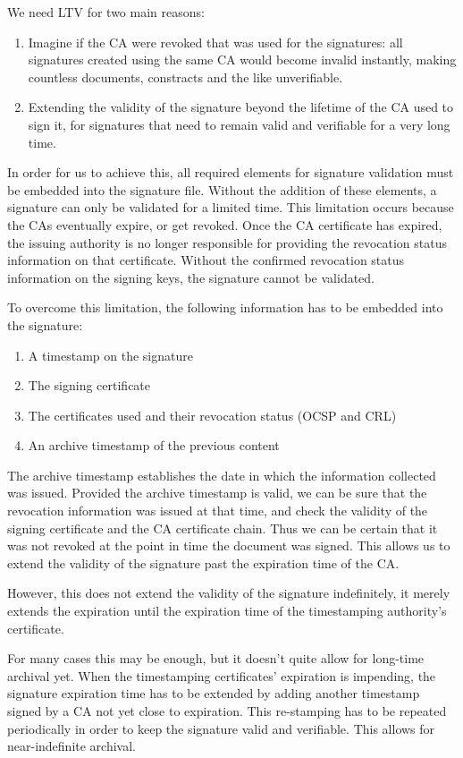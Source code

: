 We need \gls{LTV} for two main reasons:
\begin{enumerate}
    \item Imagine if the \gls{CA} were revoked that was used for the signatures: all signatures created using the same \gls{CA} would become invalid instantly, making countless documents, constracts and the like unverifiable.
    \item Extending the validity of the signature beyond the lifetime of the \gls{CA} used to sign it, for signatures that need to remain valid and verifiable for a very long time.
\end{enumerate}
In order for us to achieve this, all required elements for signature validation must be embedded into the signature file.
Without the addition of these elements, a signature can only be validated for a limited time.
This limitation occurs because the \gls{CA}s eventually expire, or get revoked.
Once the \gls{CA} certificate has expired, the issuing authority is no longer responsible for providing the revocation status information on that certificate.
Without the confirmed revocation status information on the signing keys, the signature cannot be validated.

To overcome this limitation, the following information has to be embedded into the signature:
\begin{enumerate}
    \item A timestamp on the signature
    \item The signing certificate
    \item The certificates used and their revocation status (\gls{OCSP} and \gls{CRL})
    \item An archive timestamp of the previous content
\end{enumerate}

The archive timestamp establishes the date in which the information collected was issued.
Provided the archive timestamp is valid,
we can be sure that the revocation information was issued at that time,
and check the validity of the signing certificate and the \gls{CA} certificate chain.
Thus we can be certain that it was not revoked at the point in time the document was signed.
This allows us to extend the validity of the signature past the expiration time of the \gls{CA}.

However, this does not extend the validity of the signature indefinitely,
it merely extends the expiration until the expiration time of the timestamping authority's certificate.

For many cases this may be enough, but it doesn't quite allow for long-time archival yet.
When the timestamping certificates' expiration is impending,
the signature expiration time has to be extended by adding another timestamp signed by a \gls{CA} not yet close to expiration.
This re-stamping has to be repeated periodically in order to keep the signature valid and verifiable.
This allows for near-indefinite archival.

